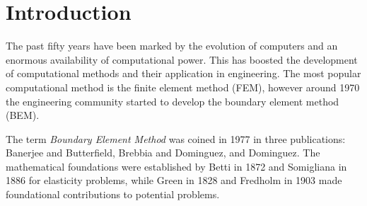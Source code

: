 
\section{Introduction}
\label{sec:introduction2}%

The past fifty years have been marked by the evolution of computers and an enormous availability of computational power. This has boosted the development of computational methods and their application in engineering. The most popular computational method is the finite element method (FEM), however around 1970 the engineering community started to develop the boundary element method (BEM).

The term \emph{Boundary Element Method} was coined in 1977 in three publications: Banerjee and Butterfield, Brebbia and Dominguez, and Dominguez. The mathematical foundations were established by Betti in 1872 and Somigliana in 1886 for elasticity problems, while Green in 1828 and Fredholm in 1903 made foundational contributions to potential problems.

